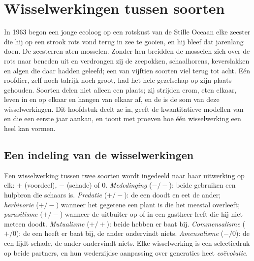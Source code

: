 \chapter{Wisselwerkingen tussen soorten}\label{ch:b1:species-interactions}

In 1963 begon een jonge ecoloog op een rotskust van de Stille Oceaan elke
zeester die hij op een strook rots vond terug in zee te gooien, en hij bleef
dat jarenlang doen. De zeesterren aten mosselen. Zonder hen breidden de
mosselen zich over de rots naar beneden uit en verdrongen zij de zeepokken,
schaalhorens, keverslakken en algen die daar hadden geleefd; een
 van vijftien soorten viel terug tot acht. Eén roofdier,
zelf noch talrijk noch groot, had het hele gezelschap op zijn plaats
gehouden. Soorten delen niet alleen een plaats; zij strijden erom, eten
elkaar, leven in en op elkaar en hangen van elkaar af, en de
 is de som van deze wisselwerkingen. Dit hoofdstuk deelt ze
in, geeft de kwantitatieve modellen van  en  die een
eerste jaar aankan, en toont met proeven hoe één wisselwerking een heel
 kan vormen.

\section{Een indeling van de wisselwerkingen}

\begin{definition}\label{def:b1:species-interactions:types}
Een wisselwerking tussen twee soorten wordt ingedeeld naar haar uitwerking
op elk: $+$ (voordeel), $-$ (schade) of $0$. \emph{Mededinging} ($-/-$):
beide gebruiken een hulpbron die schaars is. \emph{Predatie} ($+/-$): de een
doodt en eet de ander; \emph{herbivorie} ($+/-$) wanneer het gegetene een
plant is die het meestal overleeft; \emph{parasitisme} ($+/-$) wanneer de
uitbuiter op of in een gastheer leeft die hij niet meteen doodt.
\emph{Mutualisme} ($+/+$): beide hebben er baat bij. \emph{Commensalisme}
($+/0$): de een heeft er baat bij, de ander ondervindt niets.
\emph{Amensalisme} ($-/0$): de een lijdt schade, de ander ondervindt niets.
Elke wisselwerking is een selectiedruk op beide partners, en hun
wederzijdse aanpassing over generaties heet \emph{coëvolutie}.
\end{definition}

